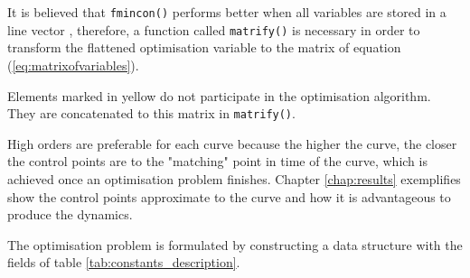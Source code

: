 \par It is believed that \texttt{fmincon()} performs better when all variables are stored in a line vector \cite{privateconversationendpoints}, therefore, a function called \texttt{matrify()} is necessary in order to transform the flattened optimisation variable to the matrix of equation (\ref{eq:matrixofvariables}). 
\par Elements marked in yellow do not participate in the optimisation algorithm. They are concatenated to this matrix in \texttt{matrify()}. 

\par High orders are preferable for each curve \cite{cichella2018bernstein} because the higher the curve, the closer the control points are to the "matching" point in time of the curve, which is achieved once an optimisation problem finishes. Chapter \ref{chap:results} exemplifies show the control points approximate to the curve and how it is advantageous to produce the dynamics.


\par The optimisation problem is formulated by constructing a data structure with the fields of table \ref{tab:constants_description}.


